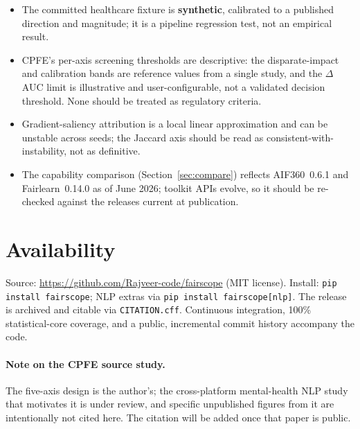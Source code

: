 \documentclass[11pt]{article}
\begin{document}
\begin{itemize}
  \item The committed healthcare fixture is \textbf{synthetic}, calibrated to a published
    direction and magnitude; it is a pipeline regression test, not an empirical result.
  \item CPFE's per-axis screening thresholds are descriptive: the disparate-impact and
    calibration bands are reference values from a single study, and the $\Delta$AUC limit is
    illustrative and user-configurable, not a validated decision threshold. None should be
    treated as regulatory criteria.
  \item Gradient-saliency attribution is a local linear approximation and can be unstable
    across seeds; the Jaccard axis should be read as consistent-with-instability, not as
    definitive.
  \item The capability comparison (Section~\ref{sec:compare}) reflects AIF360~0.6.1 and
    Fairlearn~0.14.0 as of June 2026; toolkit APIs evolve, so it should be re-checked against
    the releases current at publication.
\end{itemize}

\section{Availability}

Source: \url{https://github.com/Rajveer-code/fairscope} (MIT license). Install: \texttt{pip
install fairscope}; NLP extras via \texttt{pip install fairscope[nlp]}. The release is archived
and citable via \texttt{CITATION.cff}. Continuous integration, 100\% statistical-core coverage,
and a public, incremental commit history accompany the code.

\paragraph{Note on the CPFE source study.} The five-axis design is the author's; the
cross-platform mental-health NLP study that motivates it is under review, and specific
unpublished figures from it are intentionally not cited here. The citation will be added once
that paper is public.
\end{document}
